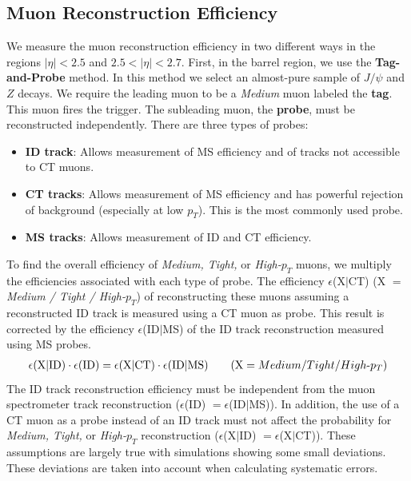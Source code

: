 \subsection{Muon Reconstruction Efficiency}\label{sec:efficiency} 
We measure the muon reconstruction efficiency in two different ways in the regions $|\eta|  < 2.5$ and $2.5 < |\eta|  < 2.7$. First, in the barrel region, we use the \textbf{Tag-and-Probe} method. In this method we select an almost-pure sample of $J/\psi$ and $Z$ decays. We require the leading muon to be a \textit{Medium} muon labeled the \textbf{tag}. This muon fires the trigger. The subleading muon, the \textbf{probe}, must be reconstructed independently. There are three types of probes:
\begin{itemize}
\item \textbf{ID track}: Allows measurement of MS efficiency and of tracks not accessible to CT muons. 
\item \textbf{CT tracks}: Allows measurement of MS efficiency and has powerful rejection of background (especially at low $p_T$). This is the most commonly used probe. 
\item \textbf{MS tracks}: Allows measurement of ID and CT efficiency.
\end{itemize}
\par \hspace{20pt} To find the overall efficiency of \textit{Medium, Tight,} or \textit{High-$p_T$} muons, we multiply the efficiencies associated with each type of probe. The efficiency  $\epsilon$(X$|$CT) (X $=$ \textit{Medium / Tight / High-$p_T$}) of reconstructing these muons assuming a reconstructed ID track is measured using a CT muon as probe. This result is corrected by the efficiency $\epsilon$(ID$|$MS) of the ID track reconstruction measured using MS probes.
\begin{align*}
	\centering 
    \epsilon \textrm{(X$|$ID)} \cdot \epsilon \textrm{(ID)} = \epsilon \textrm{(X$|$CT)} \cdot \epsilon \textrm{(ID$|$MS)} \hspace{20 pt} (\textrm{X} = Medium/Tight/High\textrm{-}p_T)
\end{align*}
The ID track reconstruction efficiency must be independent from the muon spectrometer track reconstruction ($\epsilon$(ID) $= \epsilon$(ID$|$MS)). In addition, the use of a CT muon as a probe instead of an ID track must not affect the probability for \textit{Medium, Tight,} or \textit{High-$p_T$} reconstruction ($\epsilon$(X$|$ID) $= \epsilon$(X$|$CT)). These assumptions are largely true with simulations showing some small deviations. These deviations are taken into account when calculating systematic errors. 
